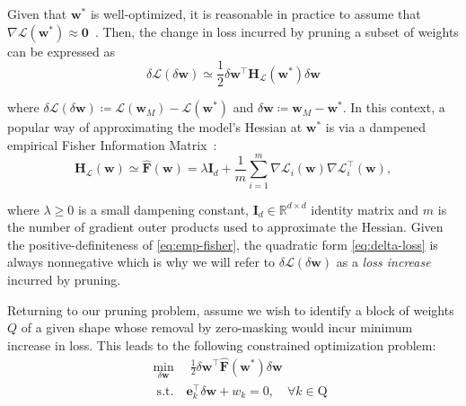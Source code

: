 \documentclass[11pt]{article}
\newcommand{\vect}[1]{\mathbf{#1}}
\newcommand{\wm}{\vect{w}_M}
\newcommand{\ws}{\vect{w}^*}
\newcommand{\w}{\mathbf{w}}
\newcommand{\hess}{\vect{H_{\mathcal{L}}}}
\newcommand{\dw}{\delta \w}
\newcommand{\dL}{\delta \mathcal{L}}
\newcommand{\eF}{\widehat{\vect{F}}}
\newcommand{\e}{\vect{e}}
\begin{document}
Given that $\ws$ is well-optimized, it is reasonable in practice to assume that \( \nabla \mathcal{L}(\ws) \approx \vect{0} \)~\cite{Singh2020WoodFisherES}.
Then, the change in loss incurred by pruning a subset of weights can be expressed as
\begin{equation}
\label{eq:delta-loss}
    \dL (\dw) \simeq \frac{1}{2} \dw^\top \hess (\ws) \dw 
\end{equation}

\noindent where \( \dL (\dw) \coloneqq \mathcal{L}(\wm) - \mathcal{L}(\ws) \) and \( \dw \coloneqq \wm - \ws \). 
In this context, a popular way of approximating the model's Hessian at $\ws$ is via a dampened  empirical Fisher Information Matrix~\cite{hassibi1993second}:
\begin{equation}
\label{eq:emp-fisher}
    \hess(\w) \simeq \eF (\w) = \lambda \vect{I}_d + \frac{1}{m} \sum_{i=1}^{m} \nabla \mathcal{L}_i(\w) \nabla \mathcal{L}^\top_i(\w), 
\end{equation}

\noindent where \( \lambda \geq 0 \) is a small dampening constant, \( \vect{I}_d \in \mathbb{R}^{d \times d} \) identity matrix and \( m \) is the number of gradient outer products used to approximate the Hessian. Given the positive-definiteness of \eqref{eq:emp-fisher}, the quadratic form \eqref{eq:delta-loss} is always nonnegative which is why we will refer to \( \dL(\dw) \) as a \textit{loss increase} incurred by pruning. 

Returning to our pruning problem, assume we wish to identify a block of weights $Q$ of a given shape whose removal by zero-masking would incur minimum increase in loss. This leads to the following constrained optimization problem: 
\begin{equation}
\label{eq:opt}
\begin{split}
    &\min_{\dw}\quad \frac{1}{2} \dw^\top \eF (\ws) \dw \\&\phantom{x}\mathrm{s.t.}\quad \e_k^\top \dw + w_k = 0, \quad \forall k \in \textrm{Q} 
\end{split}
\end{equation}
\end{document}
